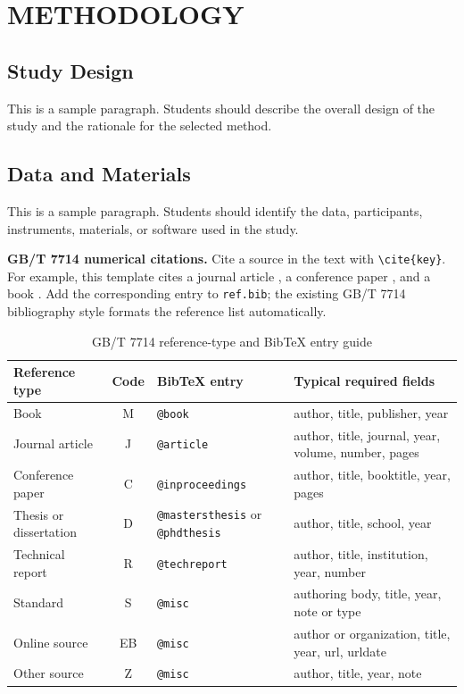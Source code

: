 \documentclass[12pt,fleqn]{report}
\begin{document}
\chapter{METHODOLOGY}

\section{Study Design}
This is a sample paragraph. Students should describe the overall design of the study and the rationale for the selected method.

\section{Data and Materials}
This is a sample paragraph. Students should identify the data, participants, instruments, materials, or software used in the study.

\noindent\textbf{GB/T 7714 numerical citations.} Cite a source in the text with \verb|\cite{key}|. For example, this template cites a journal article \cite{lecun2015deep}, a conference paper \cite{krizhevsky2012imagenet}, and a book \cite{lamport1994latex}. Add the corresponding entry to \texttt{ref.bib}; the existing GB/T 7714 bibliography style formats the reference list automatically.

\begin{table}[htbp]
\centering
\small
\caption{GB/T 7714 reference-type and BibTeX entry guide}
\label{tab:gbt-reference-types}
\begin{tabular}{|p{2.2cm}|c|p{2.6cm}|p{5.2cm}|}
\hline
\textbf{Reference type} & \textbf{Code} & \textbf{BibTeX entry} & \textbf{Typical required fields} \\
\hline
Book & M & \texttt{@book} & author, title, publisher, year \\
\hline
Journal article & J & \texttt{@article} & author, title, journal, year, volume, number, pages \\
\hline
Conference paper & C & \texttt{@inproceedings} & author, title, booktitle, year, pages \\
\hline
Thesis or dissertation & D & \texttt{@mastersthesis} or \texttt{@phdthesis} & author, title, school, year \\
\hline
Technical report & R & \texttt{@techreport} & author, title, institution, year, number \\
\hline
Standard & S & \texttt{@misc} & authoring body, title, year, note or type \\
\hline
Online source & EB & \texttt{@misc} & author or organization, title, year, url, urldate \\
\hline
Other source & Z & \texttt{@misc} & author, title, year, note \\
\hline
\end{tabular}
\end{table}
\end{document}

